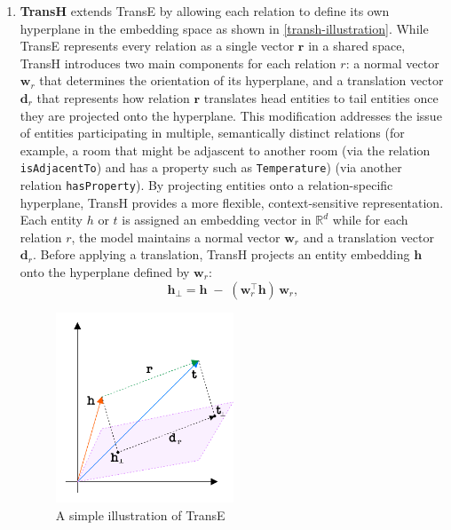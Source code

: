 \begin{enumerate}
    \item 
    \textbf{TransH} extends TransE by allowing each relation to define its own hyperplane in the embedding space as shown in \autoref{transh-illustration}. While TransE represents every relation as a single vector \(\mathbf{r}\) in a shared space, TransH introduces two main components for each relation \(r\): a normal vector \(\mathbf{w}_r\) that determines the orientation of its hyperplane, and a translation vector \(\mathbf{d}_r\) that represents how relation \(\mathbf{r}\) translates head entities to tail entities once they are projected onto the hyperplane. This modification addresses the issue of entities participating in multiple, semantically distinct relations (for example, a room that might be adjascent to  another room (via the relation \texttt{isAdjacentTo}) and has a property such as \texttt{Temperature}) (via another relation \texttt{hasProperty}). By projecting entities onto a relation-specific hyperplane, TransH provides a more flexible, context-sensitive representation. Each entity \(h\) or \(t\) is assigned an embedding vector in \(\mathbb{R}^d\) while for each relation \(r\), the model maintains a normal vector \(\mathbf{w}_r\) and a translation vector \(\mathbf{d}_r\). Before applying a translation, TransH projects an entity embedding \(\mathbf{h}\) onto the hyperplane defined by \(\mathbf{w}_r\):
\begin{equation}
    \mathbf{h}_\perp = \mathbf{h} \;-\; (\mathbf{w}_r^\top \mathbf{h})\,\mathbf{w}_r,
\end{equation}

\begin{figure}[t]
        \centering      \includegraphics[width=0.5\textwidth]{figures/transh_illustration.pdf}
        \caption{A simple illustration of TransE} \label{transh-illustration}
\end{figure}
  


\end{enumerate}
